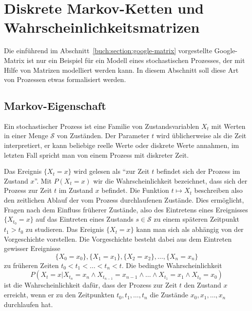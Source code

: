 %
%
%
\section{Diskrete Markov-Ketten und Wahrscheinlichkeitsmatrizen
\label{buch:section:diskrete-markov-ketten}}
Die einführend im Abschnitt~\ref{buch:section:google-matrix}
vorgestellte Google-Matrix ist nur ein Beispiel für ein
Modell eines stochastischen Prozesses, der mit Hilfe von Matrizen
modelliert werden kann.
In diesem Abschnitt soll diese Art von Prozessen etwas formalisiert
werden.

%
% 
\subsection{Markov-Eigenschaft}
Ein stochastischer Prozess ist eine Familie von Zustandsvariablen
$X_t$ mit Werten in einer Menge $\mathcal{S}$ von Zuständen.
Der Parameter $t$ wird üblicherweise als die Zeit interpretiert,
er kann beliebige reelle Werte oder diskrete Werte annahmen, im letzten
Fall spricht man von einem Prozess mit diskreter Zeit.

Das Ereignis $\{X_t=x\}$ wird gelesen als ``zur Zeit $t$ befindet sich
der Prozess im Zustand $x$''.
Mit $P(X_t = x)$ wir die Wahrscheinlichkeit bezeichnet, dass sich
der Prozess zur Zeit $t$ im Zustand $x$ befindet.
Die Funktion $t\mapsto X_t$ beschreiben also den zeitlichen Ablauf
der vom Prozess durchlaufenen Zustände.
Dies ermöglicht, Fragen nach dem Einfluss früherer Zustände,
also des Eintretens eines Ereignisses $\{X_{t_0}=x\}$ auf das Eintreten eines
Zustands $s\in\mathcal{S}$ zu einem späteren Zeitpunkt $t_1>t_0$
zu studieren.
Das Ereignis $\{X_t = x\}$ kann man sich als abhängig von der Vorgeschichte
vorstellen.
Die Vorgeschichte besteht dabei aus dem Eintreten gewisser Ereignisse
\[
\{X_0=x_0\},
\{X_1=x_1\},
\{X_2=x_2\},
\dots,
\{X_n=x_n\}
\]
zu früheren Zeiten $t_0<t_1<\dots<t_n<t$.
Die bedingte Wahrscheinlichkeit
\begin{equation}
P(X_t = x|
X_{t_n}=x_n\wedge X_{t_{n-1}}=x_{n-1}\wedge\dots\wedge X_{t_1}=x_1\wedge
X_{t_0}=x_0)
\label{buch:wahrscheinlichkeit:eqn:historybedingt}
\end{equation}
ist die Wahrscheinlichkeit dafür, dass der Prozess zur Zeit $t$ den
Zustand $x$ erreicht, wenn er zu den Zeitpunkten $t_0,t_1,\dots,t_n$
die Zustände $x_0,x_1,\dots,x_n$ durchlaufen hat.

